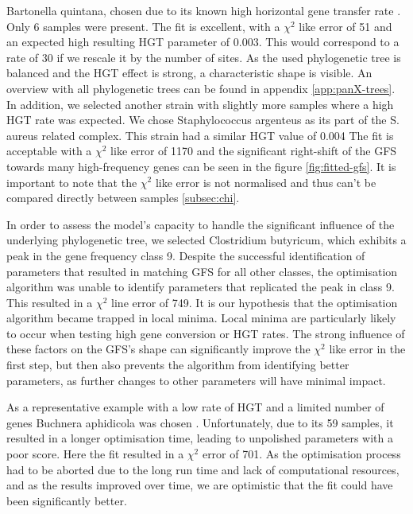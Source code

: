 Bartonella quintana, chosen due to its known high horizontal gene transfer rate \cite{Bartonella}.
Only 6 samples were present.
The fit is excellent, with a $\chi^2$ like error of 51 and an expected high resulting \ac{HGT} parameter of 0.003.
This would correspond to a rate of 30 if we rescale it by the number of sites.
As the used phylogenetic tree is balanced and the \ac{HGT} effect is strong, a characteristic  shape is visible.
An overview with all phylogenetic trees can be found in appendix \ref{app:panX-trees}.
\\
In addition, we selected another strain with slightly more samples where a high \ac{HGT} rate was expected.
We chose Staphylococcus argenteus as its part of the S. aureus related complex.
This strain had a similar \ac{HGT} value of 0.004
The fit is acceptable with a $\chi^2$ like error of 1170 and the significant right-shift of the \ac{GFS}
towards many high-frequency genes can be seen in the figure \ref{fig:fitted-gfs}.
It is important to note that the $\chi^2$ like error is not normalised and thus can't be compared directly between samples \ref{subsec:chi}.

In order to assess the model's capacity to handle the significant influence of the underlying phylogenetic tree,
we selected Clostridium butyricum, which exhibits a peak in the gene frequency class 9.
Despite the successful identification of parameters that resulted in matching \ac{GFS} for all other classes,
the optimisation algorithm was unable to identify parameters that replicated the peak in class 9.
This resulted in a $\chi^2$ line error of 749.
It is our hypothesis that the optimisation algorithm became trapped in local minima.
Local minima are particularly likely to occur when testing high gene conversion or \ac{HGT} rates.
The strong influence of these factors on the \ac{GFS}'s shape can significantly improve the $\chi^2$ like error in the first step,
but then also prevents the algorithm from identifying better parameters, as further changes to other parameters will have minimal impact.

As a representative example with a low rate of \ac{HGT} and a limited number of genes Buchnera aphidicola was chosen \cite{Buchnera}.
Unfortunately, due to its 59 samples, it resulted in a longer optimisation time, leading to unpolished parameters with a poor score. Here the fit resulted in a $\chi^2$ error of 701.
As the optimisation process had to be aborted due to the long run time and lack of computational resources, and as the results improved over time, we are optimistic that the fit could have been significantly better.

